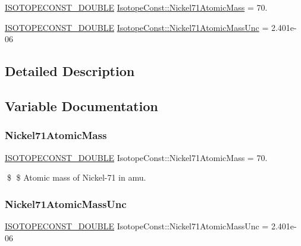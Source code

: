 \begin{DoxyCompactItemize}
\item 
\mbox{\hyperlink{group___isotope_const-_macros_ga8f45a7272ce02c0b4c65c44636ed719a}{I\+S\+O\+T\+O\+P\+E\+C\+O\+N\+S\+T\+\_\+\+D\+O\+U\+B\+LE}} \mbox{\hyperlink{group___isotope_const-_nickel-_ni71_ga8b8a439f5b0a106a3237d9d6a7e5fd1f}{Isotope\+Const\+::\+Nickel71\+Atomic\+Mass}} = 70.
\item 
\mbox{\hyperlink{group___isotope_const-_macros_ga8f45a7272ce02c0b4c65c44636ed719a}{I\+S\+O\+T\+O\+P\+E\+C\+O\+N\+S\+T\+\_\+\+D\+O\+U\+B\+LE}} \mbox{\hyperlink{group___isotope_const-_nickel-_ni71_ga9c1da1c1d36670d4f5fcddde50e00048}{Isotope\+Const\+::\+Nickel71\+Atomic\+Mass\+Unc}} = 2.\+401e-\/06
\end{DoxyCompactItemize}


\subsection{Detailed Description}


\subsection{Variable Documentation}
\mbox{\label{group___isotope_const-_nickel-_ni71_ga8b8a439f5b0a106a3237d9d6a7e5fd1f}} 
\subsubsection{\texorpdfstring{Nickel71\+Atomic\+Mass}{Nickel71AtomicMass}}
{\footnotesize\ttfamily \mbox{\hyperlink{group___isotope_const-_macros_ga8f45a7272ce02c0b4c65c44636ed719a}{I\+S\+O\+T\+O\+P\+E\+C\+O\+N\+S\+T\+\_\+\+D\+O\+U\+B\+LE}} Isotope\+Const\+::\+Nickel71\+Atomic\+Mass = 70.}

\$ \$ Atomic mass of Nickel-\/71 in amu. \mbox{\label{group___isotope_const-_nickel-_ni71_ga9c1da1c1d36670d4f5fcddde50e00048}} 
\subsubsection{\texorpdfstring{Nickel71\+Atomic\+Mass\+Unc}{Nickel71AtomicMassUnc}}
{\footnotesize\ttfamily \mbox{\hyperlink{group___isotope_const-_macros_ga8f45a7272ce02c0b4c65c44636ed719a}{I\+S\+O\+T\+O\+P\+E\+C\+O\+N\+S\+T\+\_\+\+D\+O\+U\+B\+LE}} Isotope\+Const\+::\+Nickel71\+Atomic\+Mass\+Unc = 2.\+401e-\/06}

